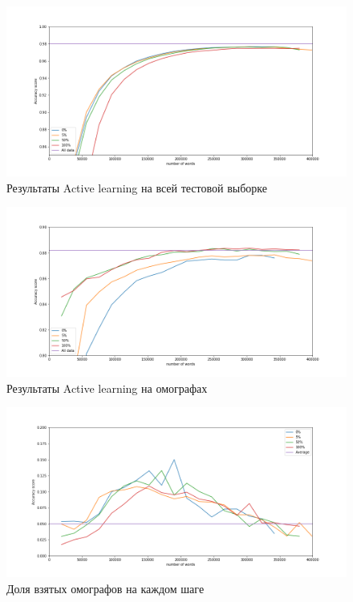 \documentclass[14pt, a4paper, russian]{extreport}
\begin{document}
\begin{figure}[H]
	\begin{center}
		\includegraphics[width=0.8\linewidth]{All_scores}
	\end{center}
	\caption{\small{Результаты Active learning на всей тестовой выборке}}
	\label{fig:al_all}
\end{figure}
\begin{figure}[H]
	\begin{center}
		\includegraphics[width=0.8\linewidth]{Homo_scores}
	\end{center}
	\caption{\small{Результаты Active learning на омографах}}
	\label{fig:al_homol}
\end{figure}
\begin{figure}[H]
	\begin{center}
		\includegraphics[width=0.8\linewidth]{Homo_perc}
	\end{center}
	\caption{\small{Доля взятых омографов на каждом шаге}}
	\label{fig:al_perc}
\end{figure}
\end{document}
